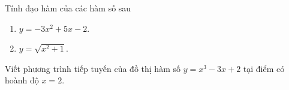 \begin{bt}%
	Tính đạo hàm của các hàm số sau
	\begin{enumerate}
		\item $y=-3x^2+5x-2$.
		\item $y=\sqrt{x^2+1}$.
	\end{enumerate}
\end{bt}

\begin{bt}%
	Viết phương trình tiếp tuyến của đồ thị hàm số $y=x^3-3x+2$ tại điểm có hoành độ $x=2$.
\end{bt}

